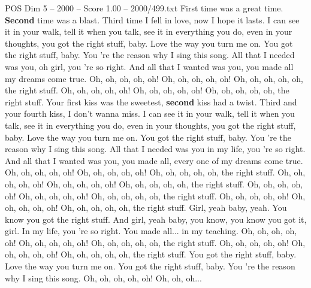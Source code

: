 \begin{textsample}{POS Dim 5 – 2000 – Score 1.00 – 2000/499.txt}  \label{ex:f5_pos_015}
First time was a great time. \textbf{Second} time was a blast.
Third time I fell in love, now I hope it lasts.
I can see it in your walk, tell it when you talk, see it in everything you do, even in your thoughts, you got the right stuff, baby.
Love the way you turn me on.
You got the right stuff, baby.
You 're the reason why I sing this song.
All that I needed was you, oh girl, you 're so right.
And all that I wanted was you, you made all my dreams come true.
Oh, oh, oh, oh, oh!
Oh, oh, oh, oh, oh!
Oh, oh, oh, oh, oh, the right stuff.
Oh, oh, oh, oh, oh!
Oh, oh, oh, oh, oh!
Oh, oh, oh, oh, oh, the right stuff.
Your first kiss was the sweetest, \textbf{second} kiss had a twist.
Third and your fourth kiss, I don't wanna miss.
I can see it in your walk, tell it when you talk, see it in everything you do, even in your thoughts, you got the right stuff, baby.
Love the way you turn me on.
You got the right stuff, baby.
You 're the reason why I sing this song.
All that I needed was you in my life, you 're so right.
And all that I wanted was you, you made all, every one of my dreams come true.
Oh, oh, oh, oh, oh!
Oh, oh, oh, oh, oh!
Oh, oh, oh, oh, oh, the right stuff.
Oh, oh, oh, oh, oh!
Oh, oh, oh, oh, oh!
Oh, oh, oh, oh, oh, the right stuff.
Oh, oh, oh, oh, oh!
Oh, oh, oh, oh, oh!
Oh, oh, oh, oh, oh, the right stuff.
Oh, oh, oh, oh, oh!
Oh, oh, oh, oh, oh!
Oh, oh, oh, oh, oh, the right stuff.
Girl, yeah baby, yeah.
You know you got the right stuff.
And girl, yeah baby, you know, you know you got it, girl.
In my life, you 're so right.
You made all... in my teaching.
Oh, oh, oh, oh, oh!
Oh, oh, oh, oh, oh!
Oh, oh, oh, oh, oh, the right stuff.
Oh, oh, oh, oh, oh!
Oh, oh, oh, oh, oh!
Oh, oh, oh, oh, oh, the right stuff.
You got the right stuff, baby.
Love the way you turn me on.
You got the right stuff, baby.
You 're the reason why I sing this song.
Oh, oh, oh, oh, oh!
Oh, oh, oh...

\end{textsample}
